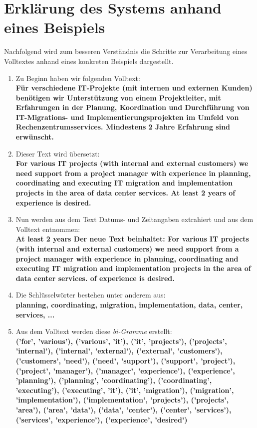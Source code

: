 \section{Erklärung des Systems anhand eines Beispiels}
Nachfolgend wird zum besseren Verständnis die Schritte zur Verarbeitung eines Volltextes anhand eines konkreten Beispiels dargestellt.\\
\begin{enumerate}
	\item Zu Beginn haben wir folgenden Volltext:\\ \textbf{Für verschiedene IT-Projekte (mit internen und externen Kunden) benötigen wir Unterstützung von einem Projektleiter, mit Erfahrungen in der Planung, Koordination und Durchführung von IT-Migrations- und Implementierungsprojekten im Umfeld von Rechenzentrumsservices. Mindestens 2 Jahre Erfahrung sind erwünscht.}
	\item Dieser Text wird übersetzt:\\ \textbf{For various IT projects (with internal and external customers) we need support from a project manager with experience in planning, coordinating and executing IT migration and implementation projects in the area of data center services. At least 2 years of experience is desired.}
	\item Nun werden aus dem Text Datums- und Zeitangaben extrahiert und aus dem Volltext entnommen:\\ \textbf{At least 2 years \grqq Der neue Text beinhaltet: \grqq For various IT projects (with internal and external customers) we need support from a project manager with experience in planning, coordinating and executing IT migration and implementation projects in the area of data center services. of experience is desired.}
	\item Die Schlüsselwörter bestehen unter anderem aus:\\ \textbf{planning, coordinating, migration, implementation, data, center, services, ...}
	\item Aus dem Volltext werden diese \emph{bi-Gramme} erstellt:\\ \textbf{('for', 'various'), ('various', 'it'), ('it', 'projects'), ('projects', 'internal'), ('internal', 'external'), ('external', 'customers'), ('customers', 'need'), ('need', 'support'), ('support', 'project'), ('project', 'manager'), ('manager', 'experience'), ('experience', 'planning'), ('planning', 'coordinating'),
	('coordinating', 'executing'), ('executing', 'it'), ('it', 'migration'), ('migration', 'implementation'), ('implementation', 'projects'), ('projects', 'area'), ('area', 'data'), ('data', 'center'), ('center', 'services'), ('services', 'experience'), ('experience', 'desired')}

\end{enumerate}

